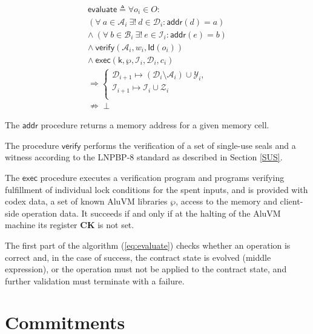 \documentclass[9pt,oneside]{amsart}
\begin{document}
\begin{multicols}{2}
\begin{equation}\label{eq:evaluate}
\begin{split}
\mathsf{evaluate} \triangleq \forall o_i \in O: \\
(\forall \ a \in \mathcal{A}_i \ \exists! \ d \in \mathcal{D}_i: \mathsf{addr}(d) = a) \\
\wedge \ (\forall \ b \in \mathcal{B}_i \ \exists! \ e \in \mathcal{I}_i: \mathsf{addr}(e) = b) \\
\wedge \ \mathsf{verify}(\mathcal{A}_i, w_i, \mathsf{Id}(o_i)) \\
\wedge \ \mathsf{exec}(\mathsf{k}, \wp, \mathcal{I}_i, \mathcal{D}_i, c_i) \\
\Rightarrow 
\begin{cases}
    \mathcal{D}_{i+1} \mapsto (\mathcal{D}_i \setminus \mathcal{A}_i) \cup \mathcal{Y}_i, \\[6pt]
    \mathcal{I}_{i+1} \mapsto \mathcal{I}_i \cup \mathcal{Z}_i \\
\end{cases} \\
\nRightarrow \perp
\end{split}
\end{equation}

The $\mathsf{addr}$ procedure returns a memory address for a given memory cell.

The procedure $\mathsf{verify}$ performs the verification of a set of single-use seals and a witness
according to the LNPBP-8 standard \cite{LNPBP8} as described in Section \ref{SUS}.

The $\mathsf{exec}$ procedure executes a verification program
and programs verifying fulfillment of individual lock conditions for the spent inputs,
and is provided with codex data, a set of known AluVM libraries $\wp$,
access to the memory and client-side operation data.
It succeeds if and only if at the halting of the AluVM machine its register \textbf{CK} is not set.

The first part of the algorithm (\ref{eq:evaluate}) checks whether an operation is correct and,
in the case of success, the contract state is evolved (middle expression),
or the operation must not be applied to the contract state,
and further validation must terminate with a failure.

\section{Commitments}\label{Commitments}


\end{multicols}
\end{document}
